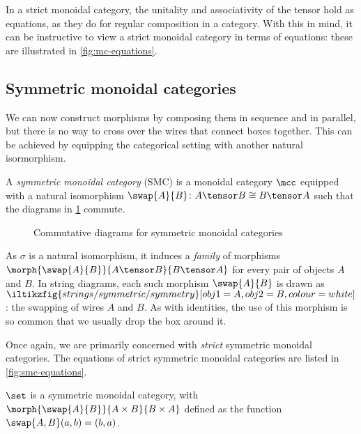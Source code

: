 In a strict monoidal category, the unitality and associativity of the tensor
hold as equations, as they do for regular composition in a category.
With this in mind, it can be instructive to view a strict monoidal category in
terms of equations: these are illustrated in \cref{fig:mc-equations}.



\subsection{Symmetric monoidal categories}

We can now construct morphisms by composing them in sequence and in parallel,
but there is no way to cross over the wires that connect boxes together.
This can be achieved by equipping the categorical setting with another natural
isormorphism.

\begin{definition}
    \label{def:symmetric-monoidal-category}
    A \emph{symmetric monoidal category} (SMC) is a monoidal category \(\mcc\)
    equipped with a natural isomorphism \(
    \swap{A}{B} \colon A \tensor B \cong B \tensor A
    \) such that the diagrams in \cref{fig:smc-diagrams} commute.
\end{definition}

\begin{figure}
    \centering
    
    

    \vspace{1em}

    
    \caption{Commutative diagrams for symmetric monoidal categories}
    \label{fig:smc-diagrams}
\end{figure}

As \(\sigma\) is a natural isomorphism, it induces
a \emph{family} of morphisms \(
\morph{\swap{A}{B}}{A \tensor B}{B \tensor A}
\) for every pair of objects \(A\) and \(B\).
In string diagrams, each such morphism \(\swap{A}{B}\) is drawn as \(
\iltikzfig{strings/symmetric/symmetry}[obj1=A, obj2=B, colour=white]
\): the swapping of wires \(A\) and \(B\).
As with identities, the use of this morphism is so common that we usually
drop the box around it.

Once again, we are primarily concerned with \emph{strict} symmetric
monoidal categories.
The equations of strict symmetric monoidal categories are listed in
\cref{fig:smc-equations}.



\begin{example}
    \(\set\) is a symmetric monoidal category, with \(
    \morph{\swap{A}{B}}{A \times B}{B \times A}
    \) defined as the function \(\swap{A,B}(a, b) = (b, a)\).
\end{example}